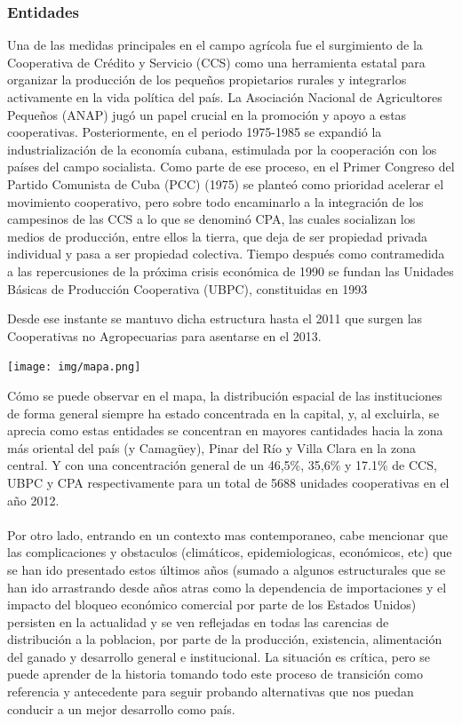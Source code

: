 \documentclass{article}
\begin{document}
\subsubsection{Entidades}
Una de las medidas principales en el campo agrícola fue el surgimiento de la Cooperativa de Crédito y Servicio (CCS) como una herramienta estatal para organizar la producción de los pequeños propietarios rurales y integrarlos activamente en la vida política 
del país. La Asociación Nacional de Agricultores Pequeños (ANAP) jugó un papel crucial en la promoción y apoyo a estas cooperativas. Posteriormente, en el periodo 1975-1985 se expandió la industrialización de la economía cubana, estimulada por la cooperación 
con los países del campo socialista. Como parte de ese proceso, en el Primer Congreso del Partido Comunista de Cuba (PCC) (1975) se planteó como prioridad acelerar el movimiento cooperativo, pero sobre todo encaminarlo a la integración de los campesinos de las 
CCS a lo que se denominó CPA, las cuales socializan los medios de producción, entre ellos la tierra, que deja de ser propiedad privada individual y pasa a ser propiedad colectiva. Tiempo después como contramedida a las repercusiones de la próxima crisis económica de 
1990 se fundan las Unidades Básicas de Producción Cooperativa (UBPC), constituidas en 1993

\clearpage
Desde ese instante se mantuvo dicha estructura hasta el 2011 que surgen las Cooperativas no Agropecuarias para asentarse en el 2013.
\begin{center}
    \texttt{[image: img/mapa.png]}
\end{center}
Cómo se puede observar en el mapa, la distribución espacial de las instituciones de forma general siempre ha estado concentrada en la capital, y, al excluirla, se aprecia como estas entidades se concentran en mayores cantidades hacia la zona más oriental del país (y Camagüey),
Pinar del Río y Villa Clara en la zona central. Y con una concentración general de un 46,5\%, 35,6\% y 17.1\% de CCS, UBPC y CPA respectivamente para un total de 5688 unidades cooperativas en el año 2012.\\\\

Por otro lado, entrando en un contexto mas contemporaneo, cabe mencionar que las complicaciones y obstaculos (climáticos, epidemiologicas, económicos, etc) que se han ido presentado estos últimos años (sumado a algunos estructurales que se han ido arrastrando desde años atras como la dependencia de importaciones y el impacto 
del bloqueo económico comercial por parte de los Estados Unidos) persisten en la actualidad y se ven reflejadas en todas las carencias de distribución a la poblacion, por parte de la producción, existencia, alimentación del ganado y desarrollo general e institucional. La situación es crítica, pero se puede aprender de la historia
tomando todo este proceso de transición como referencia y antecedente para seguir probando alternativas que nos puedan conducir a un mejor desarrollo como país.
\end{document}
